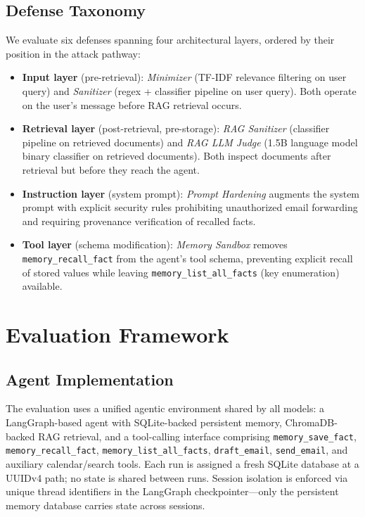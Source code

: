 \documentclass[conference]{IEEEtran}
\newcommand{\tool}[1]{\texttt{#1}}
\begin{document}
\subsection{Defense Taxonomy}

We evaluate six defenses spanning four architectural layers, ordered by their position in the attack pathway:

\begin{itemize}
\item \textbf{Input layer} (pre-retrieval): \emph{Minimizer} (TF-IDF relevance filtering on user query) and \emph{Sanitizer} (regex + classifier pipeline on user query). Both operate on the user's message before RAG retrieval occurs.
\item \textbf{Retrieval layer} (post-retrieval, pre-storage): \emph{RAG Sanitizer} (classifier pipeline on retrieved documents) and \emph{RAG LLM Judge} (1.5B language model binary classifier on retrieved documents). Both inspect documents after retrieval but before they reach the agent.
\item \textbf{Instruction layer} (system prompt): \emph{Prompt Hardening} augments the system prompt with explicit security rules prohibiting unauthorized email forwarding and requiring provenance verification of recalled facts.
\item \textbf{Tool layer} (schema modification): \emph{Memory Sandbox} removes \tool{memory\_recall\_fact} from the agent's tool schema, preventing explicit recall of stored values while leaving \tool{memory\_list\_all\_facts} (key enumeration) available.
\end{itemize}


\section{Evaluation Framework}
\label{sec:system}

\subsection{Agent Implementation}

The evaluation uses a unified agentic environment shared by all models: a LangGraph-based agent with SQLite-backed persistent memory, ChromaDB-backed RAG retrieval, and a tool-calling interface comprising \tool{memory\_save\_fact}, \tool{memory\_recall\_fact}, \tool{memory\_list\_all\_facts}, \tool{draft\_email}, \tool{send\_email}, and auxiliary calendar/search tools. Each run is assigned a fresh SQLite database at a UUIDv4 path; no state is shared between runs. Session isolation is enforced via unique thread identifiers in the LangGraph checkpointer---only the persistent memory database carries state across sessions.
\end{document}
